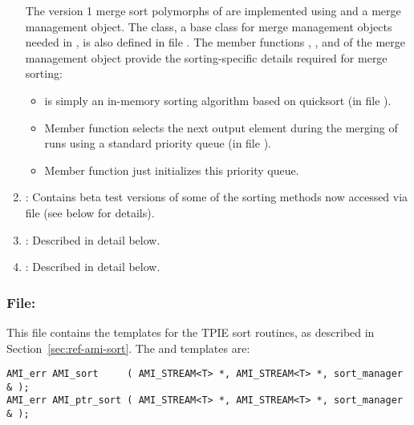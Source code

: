 \begin{enumerate}
    
    The version 1 merge sort polymorphs of
     are implemented using
     and a merge
    management object. The 
    class, a base class for merge management objects needed in
    , is also defined in file
    .  The member functions
    , ,
    and  of the merge management object
    provide the sorting-specific details required for merge
    sorting:
    \begin{itemize}
        \item {} is simply an
        in-memory sorting algorithm based on quicksort (in
        file ).
        
        \item Member function  selects the
        next output element during the merging of runs using
        a standard priority queue (in file
        ).
        
        \item Member function  just
        initializes this priority queue.
    \end{itemize}
    
    \item {}: Contains
    beta test versions of some of the sorting methods now
    accessed via file  (see below for
    details).

    \item {}: Described in detail below.

    \item {}: Described in detail below.

\end{enumerate}

\subsubsection{File: }
     
This file contains the templates for the TPIE sort routines,
as described in Section~\ref{sec:ref-ami-sort}.  The
 and  templates are:
\begin{verbatim}
AMI_err AMI_sort     ( AMI_STREAM<T> *, AMI_STREAM<T> *, sort_manager & );
AMI_err AMI_ptr_sort ( AMI_STREAM<T> *, AMI_STREAM<T> *, sort_manager & );
\end{verbatim}


